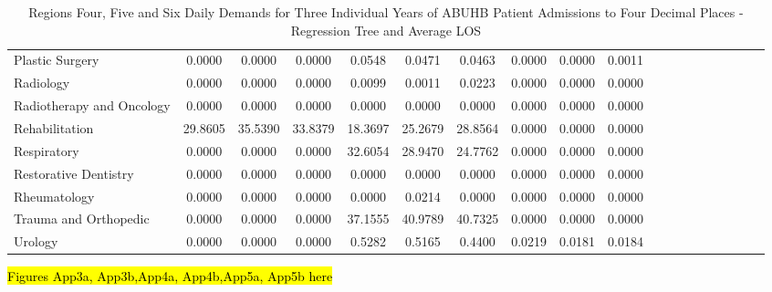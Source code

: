 \documentclass[thesis.tex]{subfiles}
\begin{document}
\begin{landscape}
\begin{table}[h!]
{\begin{tabular}{lcccccccccccccccccc}
Plastic Surgery	&0.0000&	0.0000&	0.0000&	0.0548&	0.0471&	0.0463&	0.0000&	0.0000&	0.0011\\
Radiology&	0.0000&	0.0000&	0.0000&	0.0099&	0.0011&	0.0223&	0.0000&	0.0000&	0.0000\\
Radiotherapy and Oncology&	0.0000&	0.0000&	0.0000&	0.0000&	0.0000	&0.0000&	0.0000&	0.0000&	0.0000\\
Rehabilitation&	29.8605&	35.5390&	33.8379&	18.3697&	25.2679&	28.8564&	0.0000&	0.0000&	0.0000\\
Respiratory&	0.0000&	0.0000&	0.0000&	32.6054&	28.9470&	24.7762&	0.0000&	0.0000&	0.0000\\
Restorative Dentistry	&0.0000&	0.0000&	0.0000&	0.0000&	0.0000&	0.0000&	0.0000&	0.0000&	0.0000\\
Rheumatology&	0.0000&	0.0000&	0.0000&	0.0000&	0.0214&	0.0000&	0.0000&	0.0000&	0.0000\\
Trauma and Orthopedic&	0.0000&	0.0000&	0.0000&	37.1555&	40.9789	&40.7325&	0.0000&	0.0000&	0.0000\\
Urology&	0.0000&	0.0000&	0.0000&	0.5282&	0.5165&	0.4400&	0.0219&	0.0181&	0.0184\\
\bottomrule


\end{tabular}  } 
\caption{Regions Four, Five and Six Daily Demands for Three Individual Years of ABUHB Patient Admissions to Four Decimal Places - Regression Tree and Average LOS}
    \label{apptab:LinkedDemands2b}
\end{table}

\hl{Figures App3a, App3b,App4a, App4b,App5a, App5b here}



\end{landscape}
\end{document}
